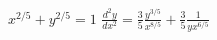{$x^{2/5}+y^{2/5}=1$
}
{$\frac{d^2y}{dx^2} = \frac35\frac{y^{3/5}}{x^{8/5}} +\frac35\frac{1}{yx^{6/5}}$
}
